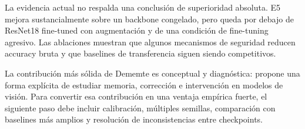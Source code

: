 \documentclass[11pt,a4paper]{article}
\begin{document}
La evidencia actual no respalda una conclusión de superioridad absoluta. E5
mejora sustancialmente sobre un backbone congelado, pero queda por debajo de
ResNet18 fine-tuned con augmentación y de una condición de fine-tuning agresivo.
Las ablaciones muestran que algunos mecanismos de seguridad reducen accuracy
bruta y que baselines de transferencia siguen siendo competitivos.

La contribución más sólida de Dememte es conceptual y diagnóstica: propone una
forma explícita de estudiar memoria, corrección e intervención en modelos de
visión. Para convertir esa contribución en una ventaja empírica fuerte, el
siguiente paso debe incluir calibración, múltiples semillas, comparación con
baselines más amplios y resolución de inconsistencias entre checkpoints.
\end{document}
